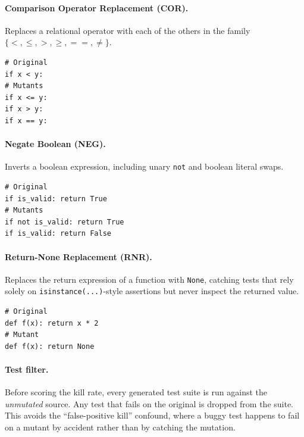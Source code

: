 \documentclass[smallextended]{svjour3}
\begin{document}
\paragraph{Comparison Operator Replacement (COR).}
Replaces a relational operator with each of the others in the
family $\{<, \le, >, \ge, ==, \ne\}$.
\begin{verbatim}
# Original
if x < y:
# Mutants
if x <= y:
if x > y:
if x == y:
\end{verbatim}

\paragraph{Negate Boolean (NEG).}
Inverts a boolean expression, including unary \texttt{not} and
boolean literal swaps.
\begin{verbatim}
# Original
if is_valid: return True
# Mutants
if not is_valid: return True
if is_valid: return False
\end{verbatim}

\paragraph{Return-None Replacement (RNR).}
Replaces the return expression of a function with
\texttt{None}, catching tests that rely solely on
\texttt{isinstance(...)}-style assertions but never inspect
the returned value.
\begin{verbatim}
# Original
def f(x): return x * 2
# Mutant
def f(x): return None
\end{verbatim}

\paragraph{Test filter.}
Before scoring the kill rate, every generated test suite is run
against the \emph{unmutated} source. Any test that fails on
the original is dropped from the suite. This avoids the
``false-positive kill'' confound, where a buggy test happens to
fail on a mutant by accident rather than by catching the
mutation.


\end{document}
